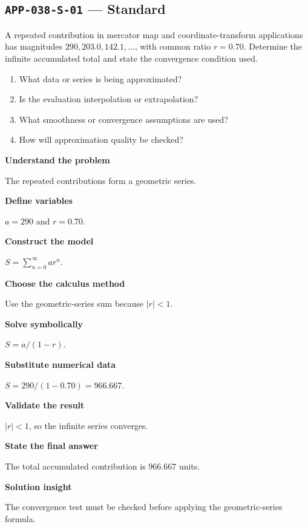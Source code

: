 \documentclass[11pt]{book}
\newcommand{\pid}[1]{\texttt{#1}}
\begin{document}
\subsection*{\pid{APP-038-S-01} — Standard}
\begin{problembox}
A repeated contribution in mercator map and coordinate-transform applications has magnitudes $290, 203.0, 142.1,\ldots$, with common ratio $r=0.70$. Determine the infinite accumulated total and state the convergence condition used.
\end{problembox}
\begin{promptbox}\begin{enumerate}
\item What data or series is being approximated?
\item Is the evaluation interpolation or extrapolation?
\item What smoothness or convergence assumptions are used?
\item How will approximation quality be checked?
\end{enumerate}\end{promptbox}
\begin{solutionbox}
\textbf{Understand the problem}\par The repeated contributions form a geometric series.\par\medskip
\textbf{Define variables}\par $a=290$ and $r=0.70$.\par\medskip
\textbf{Construct the model}\par $S=\sum_{n=0}^{\infty}ar^n$.\par\medskip
\textbf{Choose the calculus method}\par Use the geometric-series sum because $|r|<1$.\par\medskip
\textbf{Solve symbolically}\par $S=a/(1-r)$.\par\medskip
\textbf{Substitute numerical data}\par $S=290/(1-0.70)=966.667$.\par\medskip
\textbf{Validate the result}\par $|r|<1$, so the infinite series converges.\par\medskip
\textbf{State the final answer}\par The total accumulated contribution is $966.667$ units.\par\medskip
\textbf{Solution insight}\par The convergence test must be checked before applying the geometric-series formula.\par\medskip
\end{solutionbox}
\end{document}
